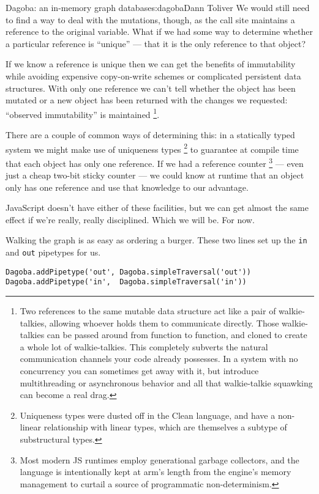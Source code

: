 \begin{aosachapter}{Dagoba: an in-memory graph database}{s:dagoba}{Dann Toliver}
We would still need to find a way to deal with the mutations, though, as
the call site maintains a reference to the original variable. What if we
had some way to determine whether a particular reference is ``unique''
--- that it is the only reference to that object?

If we know a reference is unique then we can get the benefits of
immutability while avoiding expensive copy-on-write schemes or
complicated persistent data structures. With only one reference we can't
tell whether the object has been mutated or a new object has been
returned with the changes we requested: ``observed immutability'' is
maintained \footnote{Two references to the same mutable data structure
  act like a pair of walkie-talkies, allowing whoever holds them to
  communicate directly. Those walkie-talkies can be passed around from
  function to function, and cloned to create a whole lot of
  walkie-talkies. This completely subverts the natural communication
  channels your code already possesses. In a system with no concurrency
  you can sometimes get away with it, but introduce multithreading or
  asynchronous behavior and all that walkie-talkie squawking can become
  a real drag.}.

There are a couple of common ways of determining this: in a statically
typed system we might make use of uniqueness types \footnote{Uniqueness
  types were dusted off in the Clean language, and have a non-linear
  relationship with linear types, which are themselves a subtype of
  substructural types.} to guarantee at compile time that each object
has only one reference. If we had a reference counter \footnote{Most
  modern JS runtimes employ generational garbage collectors, and the
  language is intentionally kept at arm's length from the engine's
  memory management to curtail a source of programmatic non-determinism.}
--- even just a cheap two-bit sticky counter --- we could know at
runtime that an object only has one reference and use that knowledge to
our advantage.

JavaScript doesn't have either of these facilities, but we can get
almost the same effect if we're really, really disciplined. Which we
will be. For now.

\label{in-n-out}

Walking the graph is as easy as ordering a burger. These two lines set
up the \texttt{in} and \texttt{out} pipetypes for us.

\begin{verbatim}
Dagoba.addPipetype('out', Dagoba.simpleTraversal('out'))
Dagoba.addPipetype('in',  Dagoba.simpleTraversal('in'))
\end{verbatim}


\end{aosachapter}
